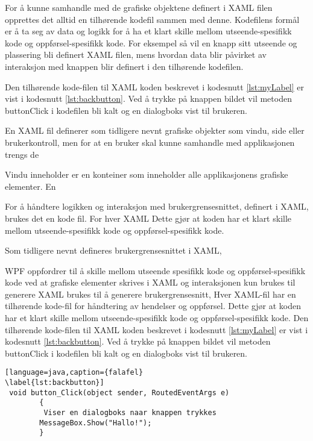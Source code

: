  
 
 
For å kunne samhandle med de grafiske objektene definert i XAML filen opprettes det alltid en tilhørende kodefil sammen med denne. Kodefilens formål er å ta seg av data og logikk for å ha et klart skille mellom utseende-spesifikk kode og oppførsel-spesifikk kode. For eksempel så vil en knapp sitt utseende og plassering bli definert XAML filen, mens hvordan data blir påvirket av interaksjon med knappen blir definert i den tilhørende kodefilen. 
 
 
Den tilhørende kode-filen til XAML koden beskrevet i kodesnutt \ref{lst:myLabel} er vist i kodesnutt \ref{lst:backbutton}. Ved å trykke på knappen bildet vil metoden button\textunderscore Click i kodefilen bli kalt og en dialogboks vist til brukeren. 
 
 
En XAML fil definerer som tidligere nevnt grafiske objekter som vindu, side eller brukerkontroll, men for at en bruker skal kunne samhandle med applikasjonen trengs de 
 
 
Vindu inneholder er en konteiner som inneholder alle applikasjonens grafiske elementer. En 
 
 
For å håndtere logikken og interaksjon med brukergrensesnittet,  definert i XAML, brukes det en kode fil. For hver XAML   Dette gjør at koden har et klart skille mellom utseende-spesifikk kode og oppførsel-spesifikk kode. 
 
 
Som tidligere nevnt defineres brukergrensesnittet i XAML, 
 
 
WPF oppfordrer til å skille mellom utseende spesifikk kode og oppførsel-spesifikk kode ved at grafiske elementer skrives i XAML og interaksjonen  kun brukes til generere  
XAML brukes til å generere brukergrensesnitt,  
Hver XAML-fil har en tilhørende kode-fil for håndtering av hendelser og oppførsel. Dette gjør at koden har et klart skille mellom utseende-spesifikk kode og oppførsel-spesifikk kode. Den tilhørende kode-filen til XAML koden beskrevet i kodesnutt \ref{lst:myLabel} er vist i kodesnutt \ref{lst:backbutton}. Ved å trykke på knappen bildet vil metoden button\textunderscore Click i kodefilen bli kalt og en dialogboks vist til brukeren. 
 
 
\begin{lstlisting}[language=java,caption={falafel} 
\label{lst:backbutton}] 
 void button_Click(object sender, RoutedEventArgs e) 
        { 
         Viser en dialogboks naar knappen trykkes 
        MessageBox.Show("Hallo!"); 
        } 
\end{lstlisting} 
 
